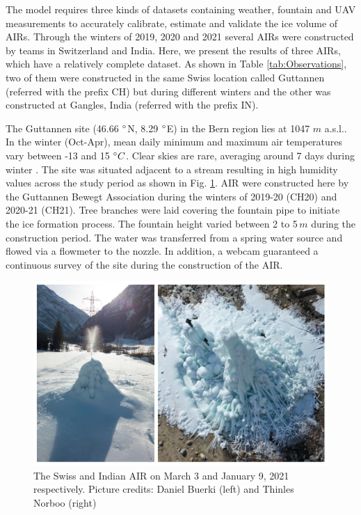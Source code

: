 \documentclass[utf8]{frontiersSCNS}
\begin{document}
The model requires three kinds of datasets containing weather, fountain and UAV measurements to accurately
calibrate, estimate and validate the ice volume of AIRs. Through the winters of 2019, 2020 and 2021 several AIRs
were constructed by teams in Switzerland and India. Here, we present the results of three AIRs, which have a
relatively complete dataset. As shown in Table \ref{tab:Observations}, two of them were constructed in the same
Swiss location called Guttannen (referred with the prefix CH) but during different winters and the other was
constructed at Gangles, India (referred with the prefix IN).

The Guttannen site (46.66 $\degree$N, 8.29 $\degree$E) in the Bern region lies at 1047 $m$ a.s.l.. In the winter
(Oct-Apr), mean daily minimum and maximum air temperatures vary between -13 and 15 $\degree C$. Clear skies are
rare, averaging around 7 days during winter \citep{guttannen}. The site was situated adjacent to a stream
resulting in high humidity values across the study period as shown in Fig. \ref{fig:2AIR}. AIR were constructed
here by the Guttannen Bewegt Association during the winters of 2019-20 (CH20) and 2020-21 (CH21). Tree branches
were laid covering the fountain pipe to initiate the ice formation process. The fountain height varied between 2
to 5\,$m$ during the construction period. The water was transferred from a spring water source and flowed via a
flowmeter to the nozzle. In addition, a webcam guaranteed a continuous survey of the site during the
construction of the AIR.

\begin{figure}
	\begin{center}
		\includegraphics[width=12 cm]{Figures/Figure_2.jpg}
	\end{center}
	\caption{The Swiss and Indian AIR on March 3 and January 9, 2021 respectively. Picture credits: Daniel Buerki (left)
		and Thinles Norboo (right)}
	\label{fig:2AIR}
\end{figure}
\end{document}
